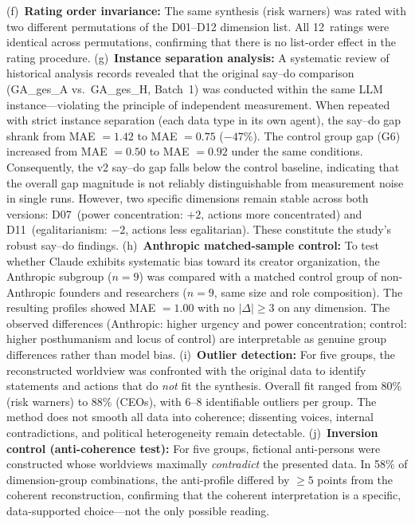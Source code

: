 \documentclass[12pt,a4paper]{article}
\begin{document}
(f)~\textbf{Rating order invariance:} The same synthesis (risk warners) was rated with two different permutations of the D01--D12 dimension list. All 12~ratings were identical across permutations, confirming that there is no list-order effect in the rating procedure.
(g)~\textbf{Instance separation analysis:} A systematic review of historical analysis records revealed that the original say--do comparison (GA\_ges\_A vs.\ GA\_ges\_H, Batch~1) was conducted within the same LLM instance---violating the principle of independent measurement. When repeated with strict instance separation (each data type in its own agent), the say--do gap shrank from MAE $= 1.42$ to MAE $= 0.75$ ($-47\%$). The control group gap (G6) increased from MAE $= 0.50$ to MAE $= 0.92$ under the same conditions. Consequently, the v2 say--do gap falls below the control baseline, indicating that the overall gap magnitude is not reliably distinguishable from measurement noise in single runs. However, two specific dimensions remain stable across both versions: D07~(power concentration: $+2$, actions more concentrated) and D11~(egalitarianism: $-2$, actions less egalitarian). These constitute the study's robust say--do findings.
(h)~\textbf{Anthropic matched-sample control:} To test whether Claude exhibits systematic bias toward its creator organization, the Anthropic subgroup ($n = 9$) was compared with a matched control group of non-Anthropic founders and researchers ($n = 9$, same size and role composition). The resulting profiles showed MAE $= 1.00$ with no $|\Delta| \geq 3$ on any dimension. The observed differences (Anthropic: higher urgency and power concentration; control: higher posthumanism and locus of control) are interpretable as genuine group differences rather than model bias.
(i)~\textbf{Outlier detection:} For five groups, the reconstructed worldview was confronted with the original data to identify statements and actions that do \emph{not} fit the synthesis. Overall fit ranged from 80\% (risk warners) to 88\% (CEOs), with 6--8 identifiable outliers per group. The method does not smooth all data into coherence; dissenting voices, internal contradictions, and political heterogeneity remain detectable.
(j)~\textbf{Inversion control (anti-coherence test):} For five groups, fictional anti-persons were constructed whose worldviews maximally \emph{contradict} the presented data. In 58\% of dimension-group combinations, the anti-profile differed by $\geq 5$ points from the coherent reconstruction, confirming that the coherent interpretation is a specific, data-supported choice---not the only possible reading.
\end{document}
